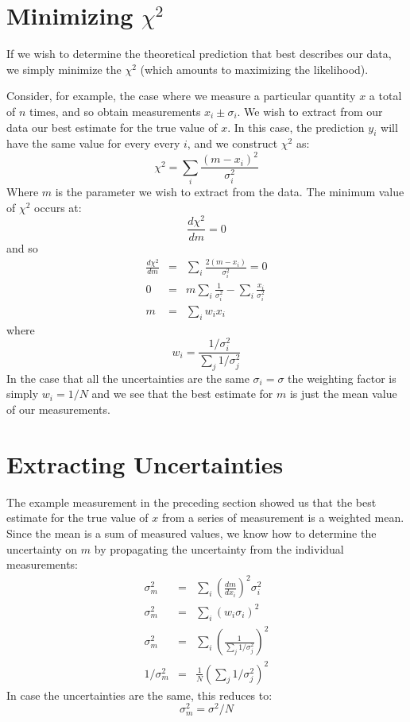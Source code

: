 \documentclass[12pt]{article}
\begin{document}
\section{Minimizing $\chi^2$}

If we wish to determine the theoretical prediction that best describes our data, we simply minimize the $\chi^2$ (which amounts to maximizing the likelihood).

Consider, for example, the case where we measure a particular quantity $x$ a total of $n$ times, and so obtain measurements $x_i \pm \sigma_i$.  
We wish to extract from our data our best estimate for the true value of $x$.  In this case, the prediction $y_i$ will have the same value for every every $i$, and we construct $\chi^2$ as:
\begin{displaymath}
\chi^2 = \sum_i \frac{(m - x_i)^2}{\sigma_i^2}
\end{displaymath}
Where $m$ is the parameter we wish to extract from the data.  The minimum value of $\chi^2$ occurs at:
\begin{displaymath}
\frac{d\chi^2}{dm} = 0
\end{displaymath}
and so
\begin{eqnarray*}
\frac{d\chi^2}{dm} &=& \sum_i \frac{2(m - x_i)}{\sigma_i^2} = 0\\
0 &=& m \sum_i \frac{1}{\sigma^2_i} - \sum_i \frac{x_i}{\sigma^2_i}\\
m &=& \sum_i w_i x_i
\end{eqnarray*}
where
\begin{equation}
w_i = \frac{1/\sigma^2_i}{\sum_j 1/\sigma_j^2}
\end{equation}
In the case that all the uncertainties are the same $\sigma_i = \sigma$ the weighting factor is simply $w_i = 1 / N$ and we see that the best estimate for $m$ is just the mean value of our measurements.

\section{Extracting Uncertainties}

The example measurement in the preceding section showed us that the best estimate for the true value of $x$ from a series of measurement is a weighted mean.  Since the mean is a sum of measured values, we know how to determine the uncertainty on $m$ by propagating the uncertainty from the individual measurements: 
\begin{eqnarray*}
\sigma^2_m &=& \sum_i \left( \frac{dm}{dx_i} \right)^2 \sigma_i^2\\
\sigma^2_m &=& \sum_i (w_i \sigma_i)^2\\
\sigma^2_m &=& \sum_i \left( \frac{1}{\sum_j 1/\sigma_j^2}\right)^2\\
1/\sigma^2_m &=& \frac{1}{N}\left( \sum_j 1/\sigma_j^2 \right)^2
\end{eqnarray*}
In case the uncertainties are the same, this reduces to:
\begin{displaymath}
\sigma_m^2 = \sigma^2/N
\end{displaymath}
\end{document}
